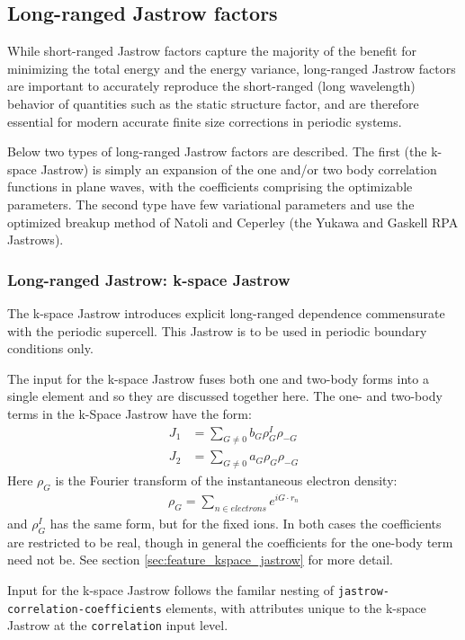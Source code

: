 \subsection{Long-ranged Jastrow factors}
While short-ranged Jastrow factors capture the majority of the benefit 
for minimizing the total energy and the energy variance, long-ranged 
Jastrow factors are important to accurately reproduce the short-ranged 
(long wavelength) behavior of quantities such as the static structure 
factor, and are therefore essential for modern accurate finite size 
corrections in periodic systems.

Below two types of long-ranged Jastrow factors are described.  The 
first (the k-space Jastrow) is simply an expansion of the one and/or 
two body correlation functions in plane waves, with the coefficients 
comprising the optimizable parameters.  The second type have few 
variational parameters and use the optimized breakup method of Natoli 
and Ceperley\cite{Natoli1995} (the Yukawa and Gaskell RPA Jastrows).


\subsubsection{Long-ranged Jastrow: k-space Jastrow}
The k-space Jastrow introduces explicit long-ranged dependence commensurate with the periodic supercell.  This Jastrow is to be used in periodic boundary conditions only.  

The input for the k-space Jastrow fuses both one and two-body forms into a single element and so they are discussed together here.  The one- and two-body terms in the k-Space Jastrow have the form:
\begin{align}
  J_1 &= \sum_{G\ne 0}b_G\rho_G^I\rho_{-G} \\
  J_2 &= \sum_{G\ne 0}a_G\rho_G\rho_{-G}
\end{align}
Here $\rho_G$ is the Fourier transform of the instantaneous electron density:
\begin{align}
  \rho_G=\sum_{n\in electrons}e^{iG\cdot r_n}
\end{align}
and $\rho_G^I$ has the same form, but for the fixed ions. In both cases the coefficients are restricted to be real, though in general the coefficients for the one-body term need not be.  See section \ref{sec:feature_kspace_jastrow} for more detail.

Input for the k-space Jastrow follows the familar nesting of \texttt{jastrow-correlation-coefficients} elements, with attributes unique to the k-space Jastrow at the \texttt{correlation} input level.

